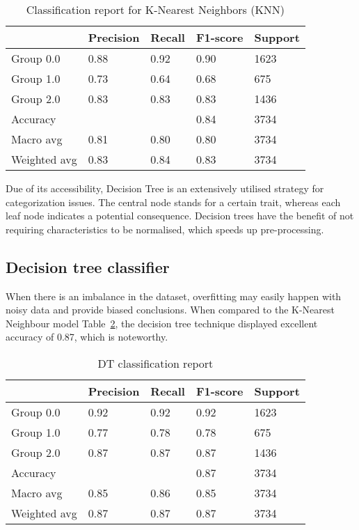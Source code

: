 \documentclass{article}
\begin{document}
\begin{table}[htbp]
  \centering
\caption{Classification report for K-Nearest Neighbors (KNN)}
  \begin{tabular}{|l|l|l|l|l|}
    \hline
                 & Precision & Recall & F1-score & Support \\ \hline
    Group 0.0    & 0.88      & 0.92   & 0.90     & 1623    \\ \hline
    Group 1.0    & 0.73      & 0.64   & 0.68     & 675     \\ \hline
    Group 2.0    & 0.83      & 0.83   & 0.83     & 1436    \\ \hline
    Accuracy     &           &        & 0.84     & 3734    \\ \hline
    Macro avg    & 0.81      & 0.80   & 0.80     & 3734    \\ \hline
    Weighted avg & 0.83      & 0.84   & 0.83     & 3734    \\ \hline
  \end{tabular}
  \label{tab:results}
\end{table}



Due of its accessibility, Decision Tree is an extensively utilised strategy for categorization issues. The central node stands for a certain trait, whereas each leaf node indicates a potential consequence. Decision trees have the benefit of not requiring characteristics to be normalised, which speeds up pre-processing. 



\subsection{Decision tree classifier}

When there is an imbalance in the dataset, overfitting may easily happen with noisy data and provide biased conclusions. When compared to the K-Nearest Neighbour model Table~\ref{tab:updated_results}, the decision tree technique displayed excellent accuracy of 0.87, which is noteworthy.


\begin{table}[htbp]
  \centering
  \caption{DT classification report}
  \begin{tabular}{|l|l|l|l|l|}
    \hline
                 & Precision & Recall & F1-score & Support \\ \hline
    Group 0.0    & 0.92      & 0.92   & 0.92     & 1623    \\ \hline
    Group 1.0    & 0.77      & 0.78   & 0.78     & 675     \\ \hline
    Group 2.0    & 0.87      & 0.87   & 0.87     & 1436    \\ \hline
    Accuracy     &           &        & 0.87     & 3734    \\ \hline
    Macro avg    & 0.85      & 0.86   & 0.85     & 3734    \\ \hline
    Weighted avg & 0.87      & 0.87   & 0.87     & 3734    \\ \hline
  \end{tabular}
  \label{tab:updated_results}
\end{table}
\end{document}
